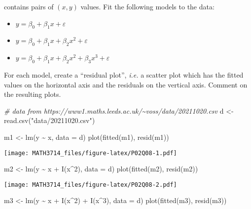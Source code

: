 \documentclass[
  a4paper,
]{article}
\newenvironment{Shaded}{\begin{snugshade}}{\end{snugshade}}
\newcommand{\AttributeTok}[1]{\textcolor[rgb]{0.77,0.63,0.00}{#1}}
\newcommand{\CommentTok}[1]{\textcolor[rgb]{0.56,0.35,0.01}{\textit{#1}}}
\newcommand{\DecValTok}[1]{\textcolor[rgb]{0.00,0.00,0.81}{#1}}
\newcommand{\FunctionTok}[1]{\textcolor[rgb]{0.00,0.00,0.00}{#1}}
\newcommand{\NormalTok}[1]{#1}
\newcommand{\OtherTok}[1]{\textcolor[rgb]{0.56,0.35,0.01}{#1}}
\newcommand{\SpecialCharTok}[1]{\textcolor[rgb]{0.00,0.00,0.00}{#1}}
\newcommand{\StringTok}[1]{\textcolor[rgb]{0.31,0.60,0.02}{#1}}
\theoremstyle{definition}
\theoremstyle{definition}
\theoremstyle{definition}
\theoremstyle{definition}
\theoremstyle{remark}
\begin{document}
contains pairs of \((x, y)\) values. Fit the following models to the data:

\begin{itemize}
\item
  \(y = \beta_0 + \beta_1 x + \varepsilon\)
\item
  \(y = \beta_0 + \beta_1 x + \beta_2 x^2 + \varepsilon\)
\item
  \(y = \beta_0 + \beta_1 x + \beta_2 x^2 + \beta_3 x^3 + \varepsilon\)
\end{itemize}

For each model, create a ``residual plot'', \emph{i.e.} a scatter plot which
has the fitted values on the horizontal axis and the residuals on the
vertical axis. Comment on the resulting plots.

\begin{myanswers}

\begin{Shaded}
\begin{Highlighting}[]
\CommentTok{\# data from https://www1.maths.leeds.ac.uk/\textasciitilde{}voss/data/20211020.csv}
\NormalTok{d }\OtherTok{\textless{}{-}} \FunctionTok{read.csv}\NormalTok{(}\StringTok{"data/20211020.csv"}\NormalTok{)}

\NormalTok{m1 }\OtherTok{\textless{}{-}} \FunctionTok{lm}\NormalTok{(y }\SpecialCharTok{\textasciitilde{}}\NormalTok{ x, }\AttributeTok{data =}\NormalTok{ d)}
\FunctionTok{plot}\NormalTok{(}\FunctionTok{fitted}\NormalTok{(m1), }\FunctionTok{resid}\NormalTok{(m1))}
\end{Highlighting}
\end{Shaded}

\texttt{[image: MATH3714\_files/figure-latex/P02Q08-1.pdf]}

\begin{Shaded}
\begin{Highlighting}[]
\NormalTok{m2 }\OtherTok{\textless{}{-}} \FunctionTok{lm}\NormalTok{(y }\SpecialCharTok{\textasciitilde{}}\NormalTok{ x }\SpecialCharTok{+} \FunctionTok{I}\NormalTok{(x}\SpecialCharTok{\^{}}\DecValTok{2}\NormalTok{), }\AttributeTok{data =}\NormalTok{ d)}
\FunctionTok{plot}\NormalTok{(}\FunctionTok{fitted}\NormalTok{(m2), }\FunctionTok{resid}\NormalTok{(m2))}
\end{Highlighting}
\end{Shaded}

\texttt{[image: MATH3714\_files/figure-latex/P02Q08-2.pdf]}

\begin{Shaded}
\begin{Highlighting}[]
\NormalTok{m3 }\OtherTok{\textless{}{-}} \FunctionTok{lm}\NormalTok{(y }\SpecialCharTok{\textasciitilde{}}\NormalTok{ x }\SpecialCharTok{+} \FunctionTok{I}\NormalTok{(x}\SpecialCharTok{\^{}}\DecValTok{2}\NormalTok{) }\SpecialCharTok{+} \FunctionTok{I}\NormalTok{(x}\SpecialCharTok{\^{}}\DecValTok{3}\NormalTok{), }\AttributeTok{data =}\NormalTok{ d)}
\FunctionTok{plot}\NormalTok{(}\FunctionTok{fitted}\NormalTok{(m3), }\FunctionTok{resid}\NormalTok{(m3))}
\end{Highlighting}
\end{Shaded}


\end{myanswers}
\end{document}
